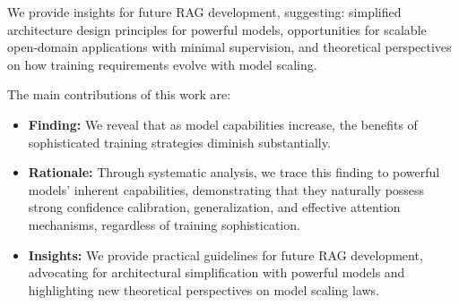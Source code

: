 



We provide insights for future RAG development, suggesting: simplified architecture design principles for powerful models, opportunities for scalable open-domain applications with minimal supervision, and theoretical perspectives on how training requirements evolve with model scaling.

The main contributions of this work are:
\vspace{-1pt}
\begin{itemize}[leftmargin=0.6cm, itemindent=0cm, itemsep=0pt]
    \item \textbf{Finding:} We reveal that as model capabilities increase, the benefits of sophisticated training strategies diminish substantially.
    \item \textbf{Rationale:} Through systematic analysis, we trace this finding to powerful models' inherent capabilities, demonstrating that they naturally possess strong confidence calibration, generalization, and effective attention mechanisms, regardless of training sophistication.
    \item \textbf{Insights:} We provide practical guidelines for future RAG development, advocating for architectural simplification with powerful models and highlighting new theoretical perspectives on model scaling laws.
\end{itemize}